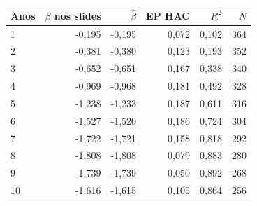 \begin{tabular}{lrrrrr}
\toprule
Anos & $\beta$ nos slides & $\widehat\beta$ & EP HAC & $R^2$ & $N$ \\
\midrule
1 & -0,195 & -0,195 & 0,072 & 0,102 & 364 \\
2 & -0,381 & -0,380 & 0,123 & 0,193 & 352 \\
3 & -0,652 & -0,651 & 0,167 & 0,338 & 340 \\
4 & -0,969 & -0,968 & 0,181 & 0,492 & 328 \\
5 & -1,238 & -1,233 & 0,187 & 0,611 & 316 \\
6 & -1,527 & -1,520 & 0,186 & 0,724 & 304 \\
7 & -1,722 & -1,721 & 0,158 & 0,818 & 292 \\
8 & -1,808 & -1,808 & 0,079 & 0,883 & 280 \\
9 & -1,739 & -1,739 & 0,050 & 0,892 & 268 \\
10 & -1,616 & -1,615 & 0,105 & 0,864 & 256 \\
\bottomrule
\end{tabular}